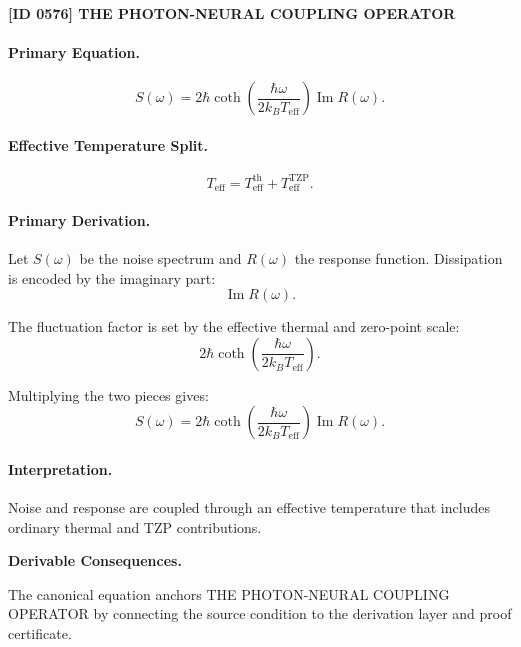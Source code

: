 \clearpage
\noindent\textbf{[ID 0576] THE PHOTON-NEURAL COUPLING OPERATOR}\par
\vspace{0.35em}
\paragraph{Primary Equation.}
\begin{equation}
S(\omega)
=
2\hbar
\coth\left(
\frac{\hbar\omega}{2k_B T_{\mathrm{eff}}}
\right)
\operatorname{Im}R(\omega).
\end{equation}

\paragraph{Effective Temperature Split.}
\begin{equation}
T_{\mathrm{eff}}
=
T_{\mathrm{eff}}^{\mathrm{th}}
+
T_{\mathrm{eff}}^{\mathrm{TZP}} .
\end{equation}

\paragraph{Primary Derivation.}
Let $S(\omega)$ be the noise spectrum and $R(\omega)$ the response function.  
Dissipation is encoded by the imaginary part:
\begin{equation}
\operatorname{Im}R(\omega).
\end{equation}

The fluctuation factor is set by the effective thermal and zero-point scale:
\begin{equation}
2\hbar
\coth\left(
\frac{\hbar\omega}{2k_B T_{\mathrm{eff}}}
\right).
\end{equation}

Multiplying the two pieces gives:
\begin{equation}
\boxed{
S(\omega)
=
2\hbar
\coth\left(
\frac{\hbar\omega}{2k_B T_{\mathrm{eff}}}
\right)
\operatorname{Im}R(\omega).
}
\end{equation}

\paragraph{Interpretation.}
Noise and response are coupled through an effective temperature that includes ordinary thermal and TZP contributions.

\par\vspace{0.35em}
\noindent\textbf{Derivable Consequences.}\quad
\begingroup
\footnotesize
\raggedright
The canonical equation anchors THE PHOTON-NEURAL COUPLING OPERATOR by connecting the source condition to the derivation layer and proof certificate.
\par\endgroup

